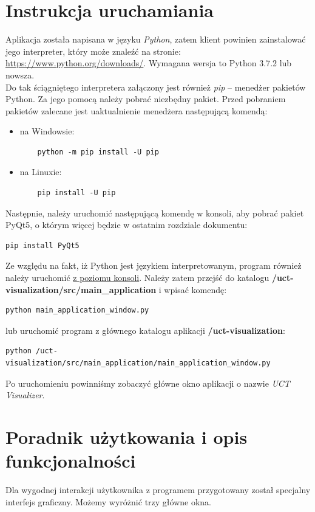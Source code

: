 \documentclass{article}
\let\oldsection\section
\renewcommand\section{\clearpage\oldsection}
\begin{document}
\section{Instrukcja uruchamiania}
Aplikacja została napisana w języku \textit{Python}, zatem klient powinien zainstalować jego interpreter, który może znaleźć na stronie: \url{https://www.python.org/downloads/}. Wymagana wersja to Python 3.7.2 lub nowsza.\\
Do tak ściągniętego interpretera załączony jest również \textit{pip} – menedżer pakietów Python. Za jego pomocą należy pobrać niezbędny pakiet. Przed pobraniem pakietów zalecane jest uaktualnienie menedżera następującą komendą:
\begin{itemize}
	\item na Windowsie:
	\begin{lstlisting}
	python -m pip install -U pip\end{lstlisting}
	\item na Linuxie:
	\begin{lstlisting}
	pip install -U pip\end{lstlisting}
\end{itemize}
Następnie, należy uruchomić następującą komendę w konsoli, aby pobrać pakiet PyQt5, o którym więcej będzie w ostatnim rozdziale dokumentu:
\begin{lstlisting}
pip install PyQt5
\end{lstlisting}
Ze względu na fakt, iż Python jest językiem interpretowanym, program również należy uruchomić \underline{z poziomu konsoli}. 
Należy zatem przejść do katalogu \textbf{/uct-visualization/src/main\_application} i wpisać komendę:
\begin{lstlisting}
python main_application_window.py
\end{lstlisting}
lub uruchomić program z głównego katalogu aplikacji \textbf{/uct-visualization}:
\begin{lstlisting}
python /uct-visualization/src/main_application/main_application_window.py
\end{lstlisting}
Po uruchomieniu powinniśmy zobaczyć główne okno aplikacji o nazwie \textit{UCT Visualizer}.

\section{Poradnik użytkowania i opis funkcjonalności}
Dla wygodnej interakcji użytkownika z programem przygotowany został specjalny interfejs graficzny. Możemy wyróżnić trzy główne okna.
\end{document}
